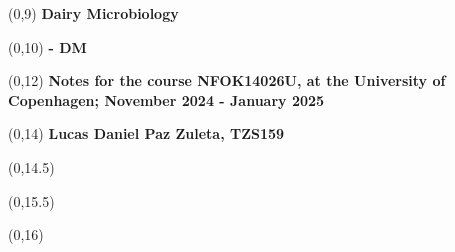 \begin{titlepage}


\begin{textblock}{9.4}(0,9)
    \Huge{\sffamily\bfseries{Dairy Microbiology}}
\end{textblock}
\begin{textblock}{9.4}(0,10)
    \Huge{\sffamily\bfseries{- DM}}
\end{textblock}

\begin{textblock}{9.4}(0,12)
    \LARGE{\sffamily\bfseries{Notes for the course NFOK14026U, at the University of Copenhagen; November 2024 - January 2025}}
\end{textblock}

\begin{textblock}{9.4}(0,14)
    \large{\sffamily\bfseries{Lucas Daniel Paz Zuleta, TZS159}}
\end{textblock}

\begin{textblock}{9.4}(0,14.5)
    \large{}
\end{textblock}

\begin{textblock}{9.4}(0,15.5)
    \large{}
\end{textblock}

\begin{textblock}{8.4}(0,16)
    \large{}
\end{textblock}


\end{titlepage}

